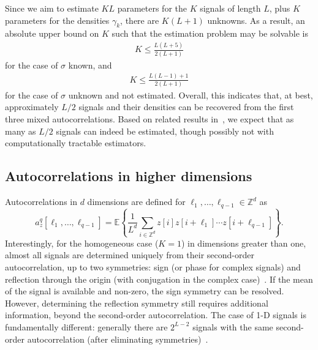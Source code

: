\documentclass[12pt]{article}
\newcommand{\E}{\mathbb{E}}
\newcommand{\1}{\mathbf{1}}
\theoremstyle{plain}
\theoremstyle{definition}
\theoremstyle{remark}
\theoremstyle{plain}
\theoremstyle{remark}
\theoremstyle{plain}
\theoremstyle{plain}
\theoremstyle{plain}
\numberwithin{equation}{section}
\begin{document}
Since we aim to estimate $KL$ parameters for the $K$ signals of length $L$, plus $K$ parameters for the densities $\gamma_k$, %
 there are $K(L+1)$ unknowns. As a result, an absolute upper bound on $K$ such that the estimation problem may be solvable is
\begin{align*}
	K \leq \frac{L(L+5)}{2(L+1)}
\end{align*}
for the case of $\sigma$ known, and
\begin{align*}
	K \leq \frac{ L (L-1) + 1}{2(L+1)}
\end{align*}
for the case of $\sigma$ unknown and not estimated. Overall, this indicates that, at best, approximately $L/2$ signals and their densities can be recovered from the first three mixed autocorrelations. Based on related results in~\cite{bandeira2017estimation}, we expect that as many as $L/2$ signals can indeed be estimated, though possibly not with computationally tractable estimators.



\subsection{Autocorrelations in higher dimensions} \label{sec:high_dimensions}

Autocorrelations in $d$ dimensions are defined for  $\ell_1,\ldots,\ell_{q-1}\in\mathbb{Z}^d$  as 
\begin{equation}
a_z^q[\ell_1,\ldots,\ell_{q-1}]   = \E\left\{\frac{1}{L^d} \sum_{i\in\mathbb{Z}^d} z[i]z[i+\ell_1]\cdots z[i+\ell_{q-1}]\right\}.
\label{eq:ac_d_dimension}
\end{equation}
Interestingly, for the homogeneous case ($K=1$) in dimensions greater than one, almost all  signals are determined uniquely from their second-order autocorrelation, up to two symmetries: sign (or phase for complex signals) and reflection through the origin (with conjugation in the complex case)~\cite{hayes1982reconstruction}. 
If the mean of the signal is available and non-zero, the sign symmetry can be resolved. However, determining the reflection symmetry still requires additional information, beyond the second-order autocorrelation.
The case of 1-D signals is fundamentally different: generally there are $2^{L-2}$ signals with the same second-order autocorrelation (after eliminating  symmetries)~\cite{beinert2015ambiguities,bendory2017fourier}. 
\end{document}
